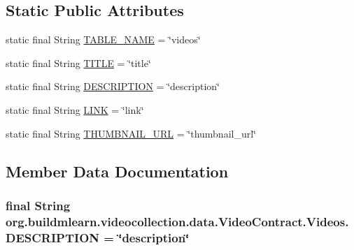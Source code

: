 \subsection*{Static Public Attributes}
\begin{DoxyCompactItemize}
\item 
static final String \hyperlink{classorg_1_1buildmlearn_1_1videocollection_1_1data_1_1VideoContract_1_1Videos_a5fbcd86a7433b1f14a2c066298b78c79}{T\+A\+B\+L\+E\+\_\+\+N\+A\+ME} = \char`\"{}videos\char`\"{}
\item 
static final String \hyperlink{classorg_1_1buildmlearn_1_1videocollection_1_1data_1_1VideoContract_1_1Videos_a65bcfcb2a263a861f0ff3986405ccfa3}{T\+I\+T\+LE} = \char`\"{}title\char`\"{}
\item 
static final String \hyperlink{classorg_1_1buildmlearn_1_1videocollection_1_1data_1_1VideoContract_1_1Videos_a910dcbefc323eb1367b065e448132a8b}{D\+E\+S\+C\+R\+I\+P\+T\+I\+ON} = \char`\"{}description\char`\"{}
\item 
static final String \hyperlink{classorg_1_1buildmlearn_1_1videocollection_1_1data_1_1VideoContract_1_1Videos_a0d76ced2941a8f66b6c5ba6ce1e8c9ae}{L\+I\+NK} = \char`\"{}link\char`\"{}
\item 
static final String \hyperlink{classorg_1_1buildmlearn_1_1videocollection_1_1data_1_1VideoContract_1_1Videos_a284dda519320b4413fd862060d06437f}{T\+H\+U\+M\+B\+N\+A\+I\+L\+\_\+\+U\+RL} = \char`\"{}thumbnail\+\_\+url\char`\"{}
\end{DoxyCompactItemize}


\subsection{Member Data Documentation}
\subsubsection[{\texorpdfstring{D\+E\+S\+C\+R\+I\+P\+T\+I\+ON}{DESCRIPTION}}]{\setlength{\rightskip}{0pt plus 5cm}final String org.\+buildmlearn.\+videocollection.\+data.\+Video\+Contract.\+Videos.\+D\+E\+S\+C\+R\+I\+P\+T\+I\+ON = \char`\"{}description\char`\"{}\hspace{0.3cm}{\ttfamily [static]}}\hypertarget{classorg_1_1buildmlearn_1_1videocollection_1_1data_1_1VideoContract_1_1Videos_a910dcbefc323eb1367b065e448132a8b}{}\label{classorg_1_1buildmlearn_1_1videocollection_1_1data_1_1VideoContract_1_1Videos_a910dcbefc323eb1367b065e448132a8b}
